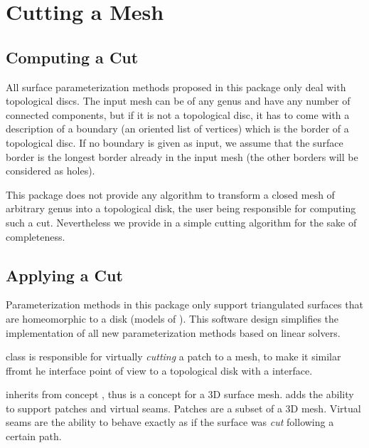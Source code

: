 \section{Cutting a Mesh}

\subsection{Computing a Cut}

All surface parameterization methods proposed in this package only
deal with topological discs.  The input mesh can be of any genus and
have any number of connected components, but if it is not a topological
disc, it has to come with a description of a boundary (an oriented list of
vertices) which is the border of a topological disc.  If no boundary  is
given as input, we assume that the surface border is the longest border already
in the input mesh (the other borders will be considered as holes).


This package does not provide any algorithm to transform a closed mesh
of arbitrary genus into a topological disk, the user being responsible
for computing such a cut. Nevertheless we provide in
 a simple cutting algorithm for
the sake of completeness.


\subsection{Applying a Cut}

Parameterization methods in this package only support triangulated
surfaces that are homeomorphic to a disk (models of
). This software design simplifies the
implementation of all new parameterization methods based on linear
solvers.

 class is responsible for virtually
{\em cutting} a patch to a  mesh,
to make it similar ffromt he interface point of view to a topological
disk with a  interface.

 inherits from concept , thus is a concept for a 3D surface mesh.
 adds the ability to support patches and virtual seams. Patches are a subset of a 3D mesh. Virtual seams are the ability to behave exactly as if the surface was {\em cut} following a certain path.

